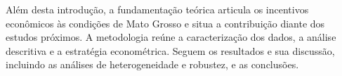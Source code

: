 Além desta introdução, a fundamentação teórica articula os incentivos econômicos às condições de Mato Grosso e situa a contribuição diante dos estudos próximos. A metodologia reúne a caracterização dos dados, a análise descritiva e a estratégia econométrica. Seguem os resultados e sua discussão, incluindo as análises de heterogeneidade e robustez, e as conclusões.
